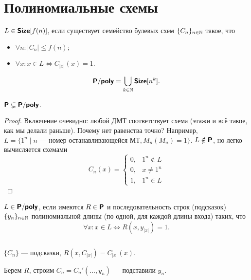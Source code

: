 \section{Полиномиальные схемы}
\begin{defn}[\Size]\index{\Size}
	$ L \in \Size[f(n)]$, если существует семейство булевых схем $ \{C_n\}_{n \in \N}$ такое, что
	\begin{itemize}[noitemsep]
		\item $ \forall n\colon \lvert C_n \rvert \le f(n)$;
		\item $ \forall x \colon x \in L \Longleftrightarrow C_{\lvert x \rvert }(x) = 1$.
	\end{itemize}
\end{defn}
\begin{defn}\index{\Ppoly}
    \[
		\Ppoly = \bigcup_{k \in \N} \Size[n^{k}]
    .\] 
\end{defn}
\begin{st}
    $ \P \subsetneq \Ppoly$.
\end{st}
\begin{proof}
    Включение очевидно: любой ДМТ соответствует схема (этажи и всё такое, как мы делали раньше).
	Почему нет равенства точно? Например, $ L = \{1^{n} \mid n \text{ --- номер останавливающейся МТ}, M_n(M_n) = 1\}$. $ L \notin \P$, но легко вычисляется схемами 
	\[
		C_{n}(x) = 
		\begin{cases}
			0, &1^{n} \notin L\\
			0, &x \ne 1^{n}\\
			1, &1^{n} \in L
		\end{cases}
	\] 
\end{proof}
\begin{defn}\index{\Size}
	$ L \in \Ppoly$, если имеются $ R \in \P$ и последовательность строк (подсказок) $ \{y_{n}\}_{n \in \N}$ полиномиальной длины (по одной, для каждой длины входа) таких, что
	\[
		\forall x\colon x \in L \Longleftrightarrow R(x, y_{\lvert x \rvert }) = 1
	.\] 
\end{defn}
\begin{note}
	$ $
	\begin{description}[noitemsep]
	    \item {} 
	$ \{C_n\}$ --- подсказки, $ R(x, C_{\lvert x \rvert }) = C_{\lvert x \rvert }(x)$.
	    \item {} 
			Берем $ R$, строим $ C_n = C_n' (\ldots, y_n) $ --- подставили $ y_n$.
	\end{description} 
\end{note}

